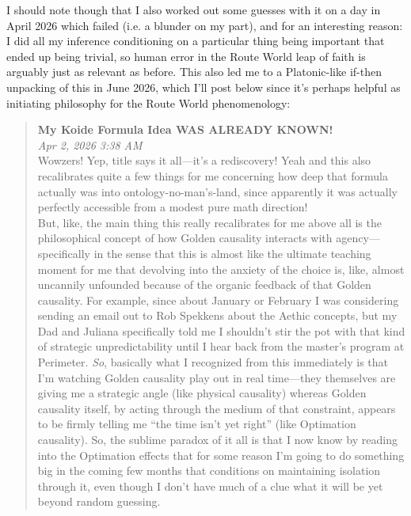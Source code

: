 I should note though that I also worked out some guesses with it on a day in April 2026 which failed (i.e. a blunder on my part), and for an interesting reason: I did all my inference conditioning on a particular thing being important that ended up being trivial, so human error in the Route World leap of faith is arguably just as relevant as before. This also led me to a Platonic-like if-then unpacking of this in June 2026, which I'll post below since it's perhaps helpful as initiating philosophy for the Route World phenomenology:
\begin{quote}
    \textbf{My Koide Formula \cite{koide1983new} Idea WAS ALREADY KNOWN!} \\
\textit{Apr 2, 2026 3:38 AM} \\
Wowzers! Yep, title says it all---it's a rediscovery! Yeah and this also recalibrates quite a few things for me concerning how deep that formula actually was into ontology-no-man's-land, since apparently it was actually perfectly accessible from a modest pure math direction!   \\
But, like, the main thing this really recalibrates for me above all is the philosophical concept of how Golden causality interacts with agency---specifically in the sense that this is almost like the ultimate teaching moment for me that devolving into the anxiety of the choice is, like, almost uncannily unfounded because of the organic feedback of that Golden causality. For example, since about January or February I was considering sending an email out to Rob Spekkens about the Aethic concepts, but my Dad and Juliana specifically told me I shouldn't stir the pot with that kind of strategic unpredictability until I hear back from the master's program at Perimeter. \textit{So}, basically what I recognized from this immediately is that I'm watching Golden causality play out in real time---they themselves are giving me a strategic angle (like physical causality) whereas Golden causality itself, by acting through the medium of that constraint, appears to be firmly telling me ``the time isn't yet right'' (like Optimation causality). So, the sublime paradox of it all is that I now know by reading into the Optimation effects that for some reason I'm going to do something big in the coming few months that conditions on maintaining isolation through it, even though I don't have much of a clue what it will be yet beyond random guessing.   \\

\end{quote}

